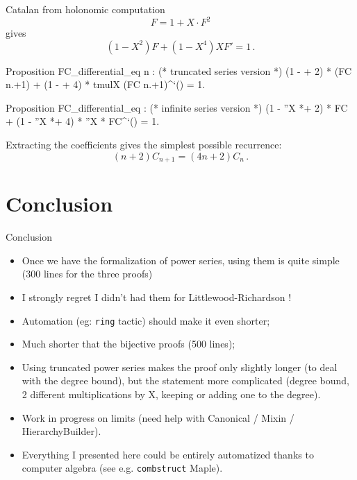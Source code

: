 \documentclass[compress,11pt]{beamer}
\begin{document}
\begin{frame}[fragile]{Catalan from holonomic computation}
  \[F = 1 + X \cdot F ^2\]
  gives
  \[(1 - X^2) F + (1 - X^4) X F' = 1\,.\]
  \begin{coqcode}
Proposition FC_differential_eq n :     (* truncated series version *)
   (1 - \X *+ 2) * (FC n.+1) + (1 - \X *+ 4) * tmulX (FC n.+1)^`() = 1.

Proposition FC_differential_eq :       (* infinite series version *)
  (1 - ''X *+ 2) * FC + (1 - ''X *+ 4) * ''X * FC^`() = 1.
\end{coqcode}
\bigskip

  Extracting the coefficients gives the simplest possible recurrence:
  \[(n+2) C_{n+1} = (4n + 2) C_{n}\,.\]
\end{frame}

\section{Conclusion}

\begin{frame}{Conclusion}

  \begin{itemize}
  \item Once we have the formalization of power series, using them is quite
    simple (300 lines for the three proofs)
  \item I strongly regret I didn't had them for Littlewood-Richardson !
  \item Automation (eg: \texttt{ring} tactic) should make it even shorter;
  \item Much shorter that the bijective proofs (500 lines);
  \item Using truncated power series makes the proof only slightly longer (to
    deal with the degree bound), but the statement more complicated (degree
    bound, 2 different multiplications by X, keeping or adding one to the
    degree).
  \item Work in progress on limits (need help with
    Canonical / Mixin / HierarchyBuilder).
  \item Everything I presented here could be entirely automatized thanks to
    computer algebra (see e.g. \texttt{combstruct} Maple\textcopyright).
  \end{itemize}
\end{frame}
\end{document}
